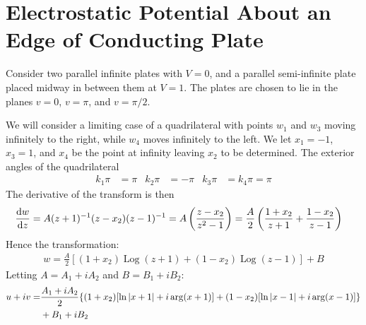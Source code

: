 \documentclass[12pt, english]{book}
\DeclareMathOperator\Log{Log}
\begin{document}
	\section{Electrostatic Potential About an Edge of Conducting Plate} \label{Electrostatic Potential About an Edge of Conducting Plate Section - Complex}
	
	Consider two parallel infinite plates with \(V=0\), and a parallel semi-infinite plate placed midway in between them at \(V=1\). The plates are chosen to lie in the planes \(v=0\), \(v = \pi\), and \(v = \pi/2\).
	
	We will consider a limiting case of a quadrilateral with points \(w_1\) and \(w_3\) moving infinitely to the right, while \(w_4\) moves infinitely to the left. We let \(x_1 = -1\), \(x_3 = 1\), and \(x_4\) be the point at infinity leaving \(x_2\) to be determined. The exterior angles of the quadrilateral 
	\begin{align*}
		k_1 \pi &= \pi &
		k_2 \pi &= -\pi &
		k_3 \pi &= k_4 \pi = \pi
	\end{align*}
	The derivative of the transform is then 
	\begin{align*}
		\dv{w}{z}
		&= A (z + 1)^{-1} (z-x_2) (z-1)^{-1}
		 = A \left(\frac{z-x_2}{z^2 - 1}\right)
		 = \frac{A}{2} \left(\frac{1 + x_2}{z + 1} + \frac{1 - x_2}{z - 1}\right)
	\end{align*}
	Hence the transformation:
	\begin{align*}
		w = \frac{A}{2}[(1 + x_2) \Log(z+1) + (1-x_2) \Log(z-1)] + B
	\end{align*}
	Letting \(A = A_1 + i A_2\) and \(B = B_1 + i B_2\):
	\begin{align*}
		u + iv
		=& \frac{A_1 + iA_2}{2}\{(1 + x_2)
		[\ln\abs{x+1} + i \arg(x+1)] + (1-x_2)[\ln\abs{x-1} + i \arg(x-1)]\} \\ &+ B_1 + i B_2
	\end{align*}
	
	
	
	
	
	
	
	
	
	
	
	
	
	
	
	
	
	
	
	
	
	
	
	
	
	
	
	
	
\end{document}
